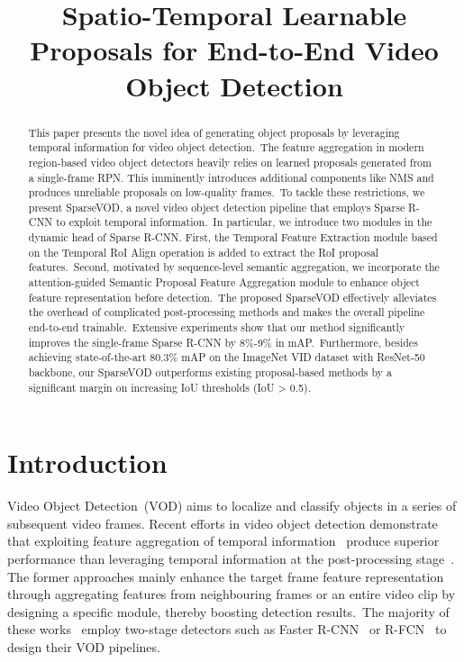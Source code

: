 \documentclass{bmvc2k}
\title{Spatio-Temporal Learnable Proposals for End-to-End Video Object Detection}
\begin{document}
\maketitle

\begin{abstract}
This paper presents the novel idea of generating object proposals by leveraging temporal information for video object detection.~The feature aggregation in modern region-based video object detectors heavily relies on learned proposals generated from a single-frame RPN. This imminently introduces additional components like NMS and produces unreliable proposals on low-quality frames.~To tackle these restrictions, we present SparseVOD, a novel video object detection pipeline that employs Sparse R-CNN to exploit temporal information.~In particular, we introduce two modules in the dynamic head of Sparse R-CNN. First, the Temporal Feature Extraction module based on the Temporal RoI Align operation is added to extract the RoI proposal features.~Second, motivated by sequence-level semantic aggregation, we incorporate the attention-guided Semantic Proposal Feature Aggregation module to enhance object feature representation before detection.~The proposed SparseVOD effectively alleviates the overhead of complicated post-processing methods and makes the overall pipeline end-to-end trainable.~Extensive experiments show that our method significantly improves the single-frame Sparse R-CNN by 8\%-9\% in mAP.~Furthermore, besides achieving state-of-the-art 80.3\% mAP on the ImageNet VID dataset with ResNet-50 backbone, our SparseVOD outperforms existing proposal-based methods by a significant margin on increasing IoU thresholds (IoU > 0.5).
\end{abstract}

\section{Introduction}
\label{sec:intro}


Video Object Detection~(VOD) aims to localize and classify objects in a series of subsequent video frames. Recent efforts in video object detection demonstrate that exploiting feature aggregation of temporal information~\cite{zhu2017deep, zhu2017flow, feichtenhofer2017detect, wang2018fully, wu2019sequence, han2020mining, gong2021temporal, han2021class, cui2021tf, hua2021temporal, han2020exploiting} produce superior performance than leveraging temporal information at the post-processing stage~\cite{han2016seq, kang2016object, kang2017object, sabater2020robust}. The former approaches mainly enhance the target frame feature representation through aggregating features from neighbouring frames or an entire video clip by designing a specific module, thereby boosting detection results.~The majority of these works~\cite{wu2019sequence, hua2021temporal, jiang2020learning, han2020mining, shvets2019leveraging} employ two-stage detectors such as Faster R-CNN~\cite{ren2015faster} or R-FCN~\cite{dai2016r} to design their VOD pipelines. 
\end{document}

